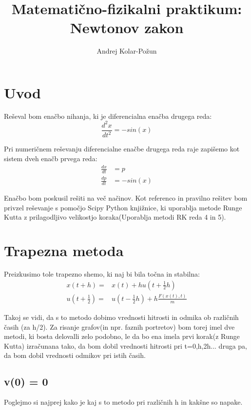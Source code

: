 \documentclass{article}
\title{Matemati{\v c}no-fizikalni praktikum: Newtonov zakon}
\author{Andrej Kolar-Po{\v z}un}
\begin{document}
\maketitle
\newpage
{}

\section{Uvod}

Reševal bom enačbo nihanja, ki je diferencialna enačba drugega reda:
\begin{equation*}
\frac{d^2x}{dt^2} = - sin(x)
\end{equation*}

Pri numeričnem reševanju diferencialne enačbe drugega reda raje zapišemo kot sistem dveh enačb prvega reda:
\begin{align*}
\frac{dx}{dt} &=  p \\
\frac{dp}{dt} & = -sin(x)
\end{align*}

Enačbo bom poskusil rešiti na več načinov. Kot referenco in pravilno rešitev bom privzel reševanje s pomočjo Scipy Python knjižnice, ki
uporablja metode Runge Kutta z prilagodljivo velikostjo koraka(Uporablja metodi RK reda 4 in 5).
\newpage
\section{Trapezna metoda}

Preizkusimo tole trapezno shemo, ki naj bi bila točna in stabilna:
\begin{align*}
x(t+h) =& x(t) + h u(t+\frac{1}{2}h) \\
u(t+\frac{1}{2}) =& u(t-\frac{1}{2}h) + h \frac{F(x(t),t)}{m}
\end{align*}

Takoj se vidi, da s to metodo dobimo vrednosti hitrosti in odmika ob različnih časih (za h/2). Za risanje grafov(in npr. faznih portretov) bom torej imel dve metodi, ki bosta delovalli zelo podobno, le da bo ena imela prvi korak(z Runge Kutta) izračunana tako, da bom dobil vrednosti hitrosti pri t=0,h,2h... druga pa, da bom dobil vrednosti odmikov pri istih časih.

\subsection{v(0) = 0}

Poglejmo si najprej kako je kaj s to metodo pri različnih h in kakšne so napake.
\end{document}

